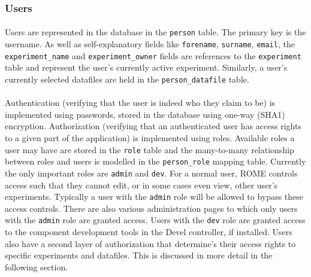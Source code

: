 \subsubsection{Users}
\label{sec:model_users}

\paragraph{}
Users are represented in the database in the \texttt{person} table. The primary key is the username. As well as self-explanatory fields like \texttt{forename}, \texttt{surname}, \texttt{email}, the \texttt{experiment\_name} and \texttt{experiment\_owner} fields are references to the \texttt{experiment} table and represent the user's currently active experiment. Similarly, a user's currently selected datafiles are held in the \texttt{person\_datafile} table.

\paragraph{}
Authentication (verifying that the user is indeed who they claim to be) is implemented using passwords, stored in the database using one-way (SHA1) encryption. Authorization (verifying that an authenticated user has access rights to a given part of the application) is implemented using roles. Available roles a user may have are stored in the \texttt{role} table and the many-to-many relationship between roles and users is modelled in the \texttt{person\_role} mapping table. Currently the only important roles are \texttt{admin} and \texttt{dev}. For a normal user, ROME controls access such that they cannot edit, or in some cases even view, other user's experiments. Typically a user with the \texttt{admin} role will be allowed to bypass these access controls. There are also various administration pages to which only users with the \texttt{admin} role are granted access. Users with the \texttt{dev} role are granted access to the component development tools in the Devel controller, if installed. Users also have a second layer of authorization that determine's their access rights to specific experiments and  datafiles. This is discussed in more detail in the following section.

